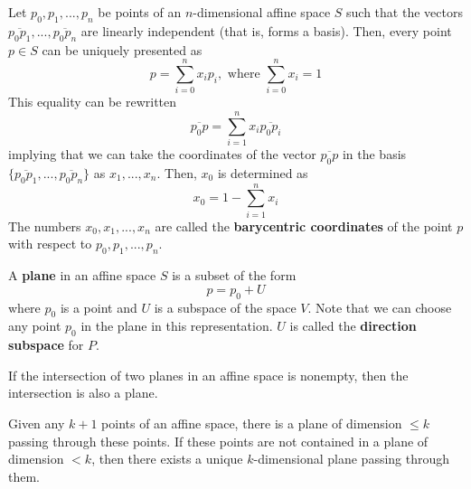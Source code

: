 \documentclass{article}
\begin{document}
    \begin{definition}
      Let $p_0, p_1, ..., p_n$ be points of an $n$-dimensional affine space $S$ such that the vectors $\overline{p_0 p_1}, ..., \overline{p_0 p_n}$ are linearly independent (that is, forms a basis). Then, every point $p \in S$ can be uniquely presented as 
      \begin{equation}
        p = \sum_{i=0}^n x_i p_i, \text{ where } \sum_{i=0}^n x_i = 1
      \end{equation}
      This equality can be rewritten
      \begin{equation}
        \overline{p_0 p} = \sum_{i=1}^n x_i \overline{p_0 p_i}
      \end{equation}
      implying that we can take the coordinates of the vector $\overline{p_0 p}$ in the basis $\{ \overline{p_0 p_1}, ..., \overline{p_0 p_n}\}$ as $x_1, ..., x_n$. Then, $x_0$ is determined as 
      \begin{equation}
        x_0 = 1 - \sum_{i=1}^n x_i
      \end{equation}
      The numbers $x_0, x_1, ..., x_n$ are called the \textbf{barycentric coordinates} of the point $p$ with respect to $p_0, p_1, ..., p_n$. 
    \end{definition}

    \begin{definition}
      A \textbf{plane} in an affine space $S$ is a subset of the form 
      \begin{equation}
        p = p_0 + U
      \end{equation}
      where $p_0$ is a point and $U$ is a subspace of the space $V$. Note that we can choose any point $p_0$ in the plane in this representation. $U$ is called the \textbf{direction subspace} for $P$. 
    \end{definition}

    \begin{lemma}
      If the intersection of two planes in an affine space is nonempty, then the intersection is also a plane. 
    \end{lemma}

    \begin{theorem}
      Given any $k+1$ points of an affine space, there is a plane of dimension $\leq k$ passing through these points. If these points are not contained in a plane of dimension $< k$, then there exists a unique $k$-dimensional plane passing through them. 
    \end{theorem}
\end{document}
